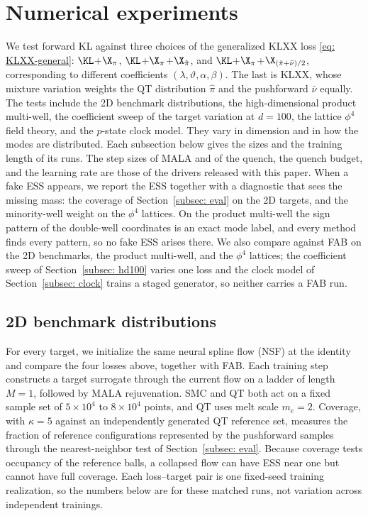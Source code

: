 \documentclass{article}
\begin{document}
\section{Numerical experiments}
\label{sec: experiments}

We test forward KL against three choices of the generalized KLXX loss \eqref{eq: KLXX-general}: $\KL$+$\X_\pi$, $\KL$+$\X_\pi$+$\X_{\hat\pi}$, and $\KL$+$\X_\pi$+$\X_{(\hat\pi+\bar\nu)/2}$, corresponding to different coefficients $(\lambda,\vartheta,\alpha,\beta)$. The last is KLXX, whose mixture variation weights the QT distribution $\hat\pi$ and the pushforward $\bar\nu$ equally. The tests include the 2D benchmark distributions, the high-dimensional product multi-well, the coefficient sweep of the target variation at $d=100$, the lattice $\phi^4$ field theory, and the $p$-state clock model. They vary in dimension and in how the modes are distributed. Each subsection below gives the sizes and the training length of its runs. The step sizes of MALA and of the quench, the quench budget, and the learning rate are those of the drivers released with this paper. When a fake ESS appears, we report the ESS together with a diagnostic that sees the missing mass: the coverage of Section~\ref{subsec: eval} on the 2D targets, and the minority-well weight on the $\phi^4$ lattices. On the product multi-well the sign pattern of the double-well coordinates is an exact mode label, and every method finds every pattern, so no fake ESS arises there. We also compare against FAB \citep{midgley2022flow} on the 2D benchmarks, the product multi-well, and the $\phi^4$ lattices; the coefficient sweep of Section~\ref{subsec: hd100} varies one loss and the clock model of Section~\ref{subsec: clock} trains a staged generator, so neither carries a FAB run.

\subsection{2D benchmark distributions}
\label{subsec: 2d-benchmark}

For every target, we initialize the same neural spline flow (NSF) \citep{durkan2019neural} at the identity and compare the four losses above, together with FAB. Each training step constructs a target surrogate through the current flow on a ladder of length $M=1$, followed by MALA rejuvenation. SMC and QT both act on a fixed sample set of $5\times10^4$ to $8\times10^4$ points, and QT uses melt scale $m_e=2$. Coverage, with $\kappa=5$ against an independently generated QT reference set, measures the fraction of reference configurations represented by the pushforward samples through the nearest-neighbor test of Section~\ref{subsec: eval}. Because coverage tests occupancy of the reference balls, a collapsed flow can have ESS near one but cannot have full coverage. Each loss--target pair is one fixed-seed training realization, so the numbers below are for these matched runs, not variation across independent trainings.
\end{document}
